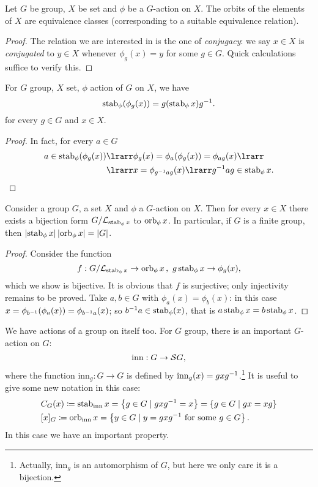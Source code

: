 \begin{proposition}
Let \(G\) be group, \(X\) be set and \(\phi\) be a \(G\)-action on \(X\). The orbits of the elements of \(X\) are equivalence classes (corresponding to a suitable equivalence relation).
\end{proposition}

\begin{proof}
The relation we are interested in is the one of {\em conjugacy}: we say \(x \in X\) is {\em conjugated} to \(y \in X\) whenever \(\phi_g (x) = y\) for some \(g \in G\). Quick calculations suffice to verify this.
\end{proof}

\begin{proposition}
For \(G\) group, \(X\) set, \(\phi\) action of \(G\) on \(X\), we have
\[\operatorname{stab}_\phi(\phi_g (x)) = g (\operatorname{stab}_\phi x) g^{-1} .\]
for every \(g \in G\) and \(x \in X\). 
\end{proposition}

\begin{proof}
In fact, for every \(a \in G\)
\begin{align*}
a \in \stab_\phi (\phi_g (x)) & \lrarr \phi_g (x) = \phi_a (\phi_g (x)) = \phi_{ag} (x) \lrarr \\
& \lrarr x = \phi_{\inv g a g} (x) \lrarr \inv g a g \in \stab_\phi x . \qedhere
\end{align*}
\end{proof}

\begin{proposition}\label{prop:OrbsStabsCosets}
Consider a group \(G\), a set \(X\) and \(\phi\) a \(G\)-action on \(X\). Then for every \(x \in X\) there exists a bijection form \(G/\mathcal L_{\operatorname{stab}_\phi x}\) to \(\operatorname{orb}_\phi x\). In particular, if \(G\) is a finite group, then \(\left\lvert\operatorname{stab}_\phi x\right\rvert \left\lvert\operatorname{orb}_\phi x\right\rvert = \left\lvert G\right\rvert\).
\end{proposition}

\begin{proof}
Consider the function
\[f : G/\mathcal L_{\operatorname{stab}_\phi x} \to \operatorname{orb}_\phi x \,, \ g \operatorname{stab}_\phi x \to \phi_g (x) ,\]
which we show is bijective. It is obvious that \(f\) is surjective; only injectivity remains to be proved. Take \(a, b \in G\) with \(\phi_a (x) = \phi_b (x)\): in this case \(x = \phi_{b^{-1}} (\phi_a (x)) = \phi_{b^{-1} a} (x)\); so \(b^{-1} a \in \operatorname{stab}_\phi (x)\), that is \(a \operatorname{stab}_\phi x = b \operatorname{stab}_\phi x\).
\end{proof}

We have actions of a group on itself too. For \(G\) group, there is an important \(G\)-action on \(G\):
\[\text{inn} : G \to \mathcal S G ,\]
where the function \(\text{inn}_g : G \to G\) is defined by \(\text{inn}_g(x) = g xg^{-1}\).\footnote{Actually, \(\text{inn}_g\) is an automorphism of \(G\), but here we only care it is a bijection.} It is useful to give some new notation in this case:
\begin{align*}
& C_G(x) \coloneq \operatorname{stab}_{\text{inn}} x = \left\{g \in G \mid g x g^{-1} = x\right\} = \left\{g \in G \mid gx = xg\right\} \\
& [x]_G \coloneq \operatorname{orb}_{\text{inn}} x = \left\{y \in G \mid y = g x g^{-1} \text{ for some } g \in G\right\} .
\end{align*}
In this case we have an important property.

